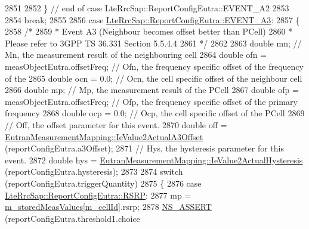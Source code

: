 \begin{DoxyCode}
2851 
2852       \} \textcolor{comment}{// end of case LteRrcSap::ReportConfigEutra::EVENT\_A2}
2853 
2854       \textcolor{keywordflow}{break};
2855 
2856     \textcolor{keywordflow}{case} \hyperlink{structns3_1_1LteRrcSap_1_1ReportConfigEutra_ab8152dc095987f60bee2e9115046902fa2899a3564e1c06edb586b1768ccf3acd}{LteRrcSap::ReportConfigEutra::EVENT\_A3}:
2857       \{
2858         \textcolor{comment}{/*}
2859 \textcolor{comment}{         * Event A3 (Neighbour becomes offset better than PCell)}
2860 \textcolor{comment}{         * Please refer to 3GPP TS 36.331 Section 5.5.4.4}
2861 \textcolor{comment}{         */}
2862 
2863         \textcolor{keywordtype}{double} mn; \textcolor{comment}{// Mn, the measurement result of the neighbouring cell}
2864         \textcolor{keywordtype}{double} ofn = measObjectEutra.offsetFreq; \textcolor{comment}{// Ofn, the frequency specific offset of the frequency of
       the}
2865         \textcolor{keywordtype}{double} ocn = 0.0; \textcolor{comment}{// Ocn, the cell specific offset of the neighbour cell}
2866         \textcolor{keywordtype}{double} mp; \textcolor{comment}{// Mp, the measurement result of the PCell}
2867         \textcolor{keywordtype}{double} ofp = measObjectEutra.offsetFreq; \textcolor{comment}{// Ofp, the frequency specific offset of the primary
       frequency}
2868         \textcolor{keywordtype}{double} ocp = 0.0; \textcolor{comment}{// Ocp, the cell specific offset of the PCell}
2869         \textcolor{comment}{// Off, the offset parameter for this event.}
2870         \textcolor{keywordtype}{double} off = \hyperlink{classns3_1_1EutranMeasurementMapping_af804c5582b55b0e7f644efe8da1f21ab}{EutranMeasurementMapping::IeValue2ActualA3Offset}
       (reportConfigEutra.a3Offset);
2871         \textcolor{comment}{// Hys, the hysteresis parameter for this event.}
2872         \textcolor{keywordtype}{double} hys = \hyperlink{classns3_1_1EutranMeasurementMapping_ac0c6d0adbba21c8531600fed399f9f21}{EutranMeasurementMapping::IeValue2ActualHysteresis}
       (reportConfigEutra.hysteresis);
2873 
2874         \textcolor{keywordflow}{switch} (reportConfigEutra.triggerQuantity)
2875           \{
2876           \textcolor{keywordflow}{case} \hyperlink{structns3_1_1LteRrcSap_1_1ReportConfigEutra_a82343ddf526faba0483431ea5882a3efa5b7591e86ab7bcefc7fe1528762114d7}{LteRrcSap::ReportConfigEutra::RSRP}:
2877             mp = \hyperlink{classns3_1_1LteUeRrc_a93094dcd5c235b2e2a8a299125100a57}{m\_storedMeasValues}[\hyperlink{classns3_1_1LteUeRrc_aa9d3317734eea9158371d9fccf3a0c48}{m\_cellId}].rsrp;
2878             \hyperlink{assert_8h_a6dccdb0de9b252f60088ce281c49d052}{NS\_ASSERT} (reportConfigEutra.threshold1.choice

\end{DoxyCode}
